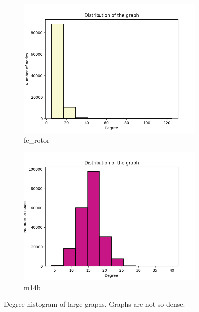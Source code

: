 \begin{figure}[h!]
\begin{subfigure}{.35\textwidth}
  \centering
  \includegraphics[width=\linewidth]{large_graphs/fe_rotor.png}  
  \caption{fe\_rotor}
  \label{fig:sub-third}
\end{subfigure}
\begin{subfigure}{.35\textwidth}
  \centering
  \includegraphics[width=\linewidth]{large_graphs/m14b.png}  
  \caption{m14b}
  \label{fig:sub-fourth}
\end{subfigure}
\caption{Degree histogram of large graphs. Graphs are not so dense.}
\label{fig:fig}
\end{figure}

